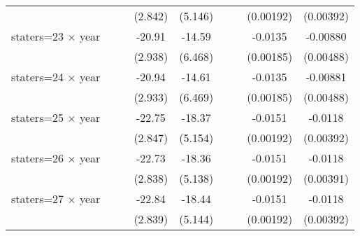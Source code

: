 {\begin{longtable}{l*{8}{c}}
                    &                     &                     &     (2.842)         &     (5.146)         &                     &                     &   (0.00192)         &   (0.00392)         \\
[1em]
staters=23 $\times$ year&                     &                     &      -20.91\sym{***}&      -14.59\sym{**} &                     &                     &     -0.0135\sym{***}&    -0.00880\sym{*}  \\
                    &                     &                     &     (2.938)         &     (6.468)         &                     &                     &   (0.00185)         &   (0.00488)         \\
[1em]
staters=24 $\times$ year&                     &                     &      -20.94\sym{***}&      -14.61\sym{**} &                     &                     &     -0.0135\sym{***}&    -0.00881\sym{*}  \\
                    &                     &                     &     (2.933)         &     (6.469)         &                     &                     &   (0.00185)         &   (0.00488)         \\
[1em]
staters=25 $\times$ year&                     &                     &      -22.75\sym{***}&      -18.37\sym{***}&                     &                     &     -0.0151\sym{***}&     -0.0118\sym{***}\\
                    &                     &                     &     (2.847)         &     (5.154)         &                     &                     &   (0.00192)         &   (0.00392)         \\
[1em]
staters=26 $\times$ year&                     &                     &      -22.73\sym{***}&      -18.36\sym{***}&                     &                     &     -0.0151\sym{***}&     -0.0118\sym{***}\\
                    &                     &                     &     (2.838)         &     (5.138)         &                     &                     &   (0.00192)         &   (0.00391)         \\
[1em]
staters=27 $\times$ year&                     &                     &      -22.84\sym{***}&      -18.44\sym{***}&                     &                     &     -0.0151\sym{***}&     -0.0118\sym{***}\\
                    &                     &                     &     (2.839)         &     (5.144)         &                     &                     &   (0.00192)         &   (0.00392)         \\

\end{longtable}}
